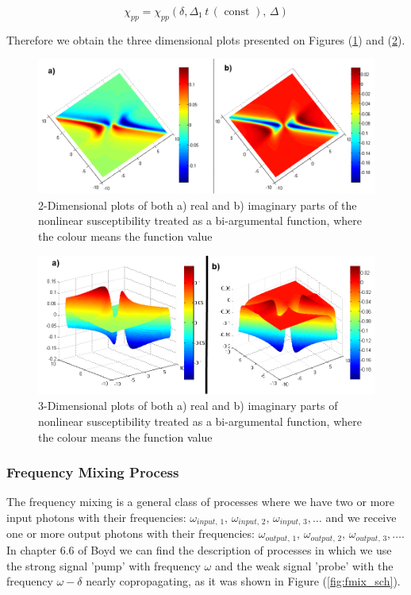 \documentclass[12pt,twoside,a4paper]{article}
\numberwithin{equation}{subsection}
\numberwithin{figure}{subsection}
\begin{document}
\begin{equation} \label{eq:pnp_2args}
  \chi_{pp} = \chi_{pp}(\delta, \Delta_1 \, t \, (\text{ const }), \,\Delta )
\end{equation}

Therefore we obtain the three dimensional plots presented on Figures (\ref{fig:physical_pnp_2d}) and (\ref{fig:physical_pnp_3d}).

\begin{figure}
  \includegraphics[width=150mm]{img/pnp_2d.png}
  \caption{2-Dimensional plots of both a) real and b) imaginary parts of the nonlinear susceptibility treated as a bi-argumental
  function, where the colour means the function value
  \label{fig:physical_pnp_2d}}
\end{figure}

\begin{figure} 
  \includegraphics[width=150mm]{img/pnp_3d.png}
  \caption{3-Dimensional plots of both a) real and b) imaginary parts of nonlinear susceptibility treated as a bi-argumental
  function, where the colour means the function value
  \label{fig:physical_pnp_3d}}
\end{figure}


\subsubsection*{Frequency Mixing Process} \label{chap:physical_fm}

The frequency mixing is a general class of processes where we have two or more input photons with their frequencies:
${\omega_{input, \,1}}, \,{\omega_{input, \,2}}, \,{\omega_{input, \,3}}, \ldots $ and we receive one or more output photons with
their frequencies: ${\omega_{output, \,1}}, \,{\omega_{output,\,2}}, \,{\omega_{output, \,3}}, \ldots $. In chapter 6.6 of Boyd
\cite{boyd_nlo} we can find the description of processes in which we use the strong signal 'pump' with frequency $\omega$
and the weak signal 'probe' with the frequency $\omega  - \delta $ nearly copropagating, as it was shown in Figure
(\ref{fig:fmix_sch}).
\end{document}
